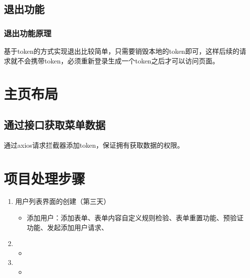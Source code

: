 \subsection{退出功能}
\subsubsection{退出功能原理}
基于token的方式实现退出比较简单，只需要销毁本地的token即可，这样后续的请求就不会携带token，必须重新登录生成一个token之后才可以访问页面。
\section{主页布局}
\subsection{通过接口获取菜单数据}

通过axios请求拦截器添加token，保证拥有获取数据的权限。

\section{项目处理步骤}
\begin{enumerate}
    \item 用户列表界面的创建（第三天）
          \begin{itemize}
              \item 添加用户：添加表单、表单内容自定义规则检验、表单重置功能、预验证功能、发起添加用户请求、
          \end{itemize}
    \item \begin{itemize}
              \item
          \end{itemize}
    \item \begin{itemize}
              \item
          \end{itemize}
\end{enumerate}